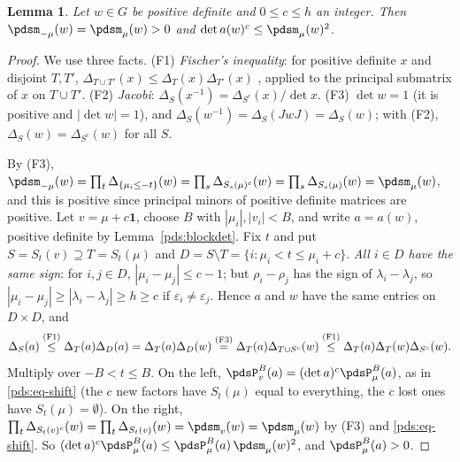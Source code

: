 \documentclass[10pt]{amsart}
\newtheorem{lemma}[theorem]{Lemma}
\theoremstyle{definition}
\theoremstyle{remark}
\begin{document}
\begin{lemma}\label{pds:fischer}
Let $w\in G$ be positive definite and $0\le c\le h$ an integer. Then $\pdsm_{-\mu}(w)=\pdsm_\mu(w)>0$
and $\det a(w)^c\le\pdsm_\mu(w)^2$.
\end{lemma}
\begin{proof}
We use three facts. (F1) \emph{Fischer's inequality}: for positive definite $x$ and disjoint $T,T'$,
$\Delta_{T\cup T'}(x)\le\Delta_T(x)\Delta_{T'}(x)$ \cite[Theorem~7.8.5]{HornJohnson}, applied to the
principal submatrix of $x$ on $T\cup T'$.
(F2) \emph{Jacobi}: $\Delta_S(x^{-1})=\Delta_{S^c}(x)/\det x$. (F3) $\det w=1$ (it is positive and
$|\det w|=1$), and $\Delta_S(w^{-1})=\Delta_S(JwJ)=\Delta_S(w)$; with (F2), $\Delta_S(w)=
\Delta_{S^c}(w)$ for all $S$.

By (F3), $\pdsm_{-\mu}(w)=\prod_t\Delta_{\{\mu_i\le-t\}}(w)=\prod_s\Delta_{S_s(\mu)^c}(w)=\prod_s
\Delta_{S_s(\mu)}(w)=\pdsm_\mu(w)$, and this is positive since principal minors of positive definite
matrices are positive. Let $v=\mu+c\mathbf 1$, choose $B$ with $|\mu_i|,|v_i|<B$, and write $a=a(w)$,
positive definite by Lemma~\ref{pds:blockdet}. Fix $t$ and put $S=S_t(v)\supseteq T=S_t(\mu)$ and
$D=S\setminus T=\{i:\mu_i<t\le\mu_i+c\}$. \emph{All $i\in D$ have the same sign}: for $i,j\in D$,
$|\mu_i-\mu_j|\le c-1$; but $\rho_i-\rho_j$ has the sign of $\lambda_i-\lambda_j$, so $|\mu_i-\mu_j|
\ge|\lambda_i-\lambda_j|\ge h\ge c$ if $\varepsilon_i\ne\varepsilon_j$. Hence $a$ and $w$ have the same
entries on $D\times D$, and
\[
\Delta_S(a)\overset{\textup{(F1)}}\le\Delta_T(a)\Delta_D(a)=\Delta_T(a)\Delta_D(w)
\overset{\textup{(F3)}}=\Delta_T(a)\Delta_{T\cup S^c}(w)\overset{\textup{(F1)}}\le\Delta_T(a)
\Delta_T(w)\Delta_{S^c}(w).
\]
Multiply over $-B<t\le B$. On the left, $\pdsP^B_v(a)=(\det a)^c\pdsP^B_\mu(a)$, as in
\eqref{pds:eq-shift} (the $c$ new factors have $S_t(\mu)$ equal to everything, the $c$ lost ones
have $S_t(\mu)=\emptyset$). On the right, $\prod_t\Delta_{S_t(v)^c}(w)=\prod_t\Delta_{S_t(v)}(w)=
\pdsm_v(w)=\pdsm_\mu(w)$ by (F3) and \eqref{pds:eq-shift}. So $(\det a)^c\pdsP^B_\mu(a)\le
\pdsP^B_\mu(a)\,\pdsm_\mu(w)^2$, and $\pdsP^B_\mu(a)>0$.
\end{proof}
\end{document}
